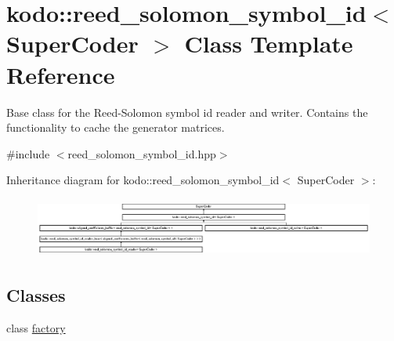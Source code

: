 \hypertarget{classkodo_1_1reed__solomon__symbol__id}{\section{kodo\-:\-:reed\-\_\-solomon\-\_\-symbol\-\_\-id$<$ Super\-Coder $>$ Class Template Reference}
\label{classkodo_1_1reed__solomon__symbol__id}
}


Base class for the Reed-\/\-Solomon symbol id reader and writer. Contains the functionality to cache the generator matrices.  




{\ttfamily \#include $<$reed\-\_\-solomon\-\_\-symbol\-\_\-id.\-hpp$>$}

Inheritance diagram for kodo\-:\-:reed\-\_\-solomon\-\_\-symbol\-\_\-id$<$ Super\-Coder $>$\-:\begin{figure}[H]
\begin{center}
\leavevmode
\includegraphics[height=1.969058cm]{classkodo_1_1reed__solomon__symbol__id}
\end{center}
\end{figure}
\subsection*{Classes}
\begin{DoxyCompactItemize}
\item 
class \hyperlink{classkodo_1_1reed__solomon__symbol__id_1_1factory}{factory}
\end{DoxyCompactItemize}
